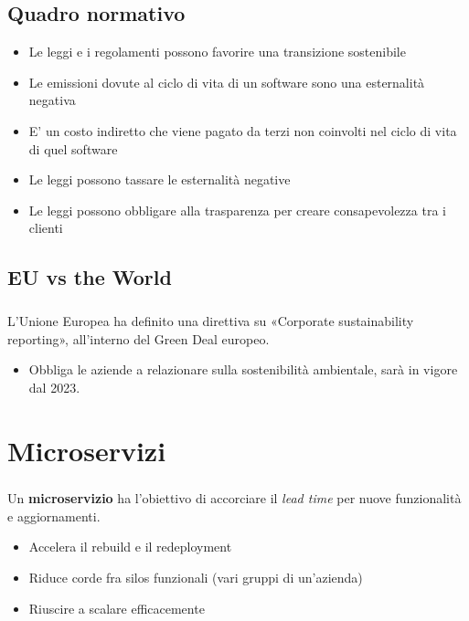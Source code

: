 \documentclass[a4paper, 12pt]{report}
\begin{document}
          \section{Quadro normativo}
          \begin{itemize}
            \item Le leggi e i regolamenti possono favorire una transizione sostenibile
            \item Le emissioni dovute al ciclo di vita di un software sono una esternalità negativa
            \item E’ un costo indiretto che viene pagato da terzi non coinvolti nel ciclo di vita di quel software
            \item Le leggi possono tassare le esternalità negative 
            \item Le leggi possono obbligare alla trasparenza per creare consapevolezza tra i clienti
          \end{itemize}
          \section{EU vs the World}
          \paragraph{}L’Unione Europea ha definito una direttiva su «Corporate sustainability reporting», all’interno del Green Deal europeo.
          \begin{itemize}
            \item Obbliga le aziende a relazionare sulla sostenibilità ambientale, sarà in vigore dal 2023.
          \end{itemize}
      \chapter{Microservizi}
          \paragraph{}Un \textbf{microservizio} ha l'obiettivo di accorciare il \textit{lead time} per nuove funzionalità e aggiornamenti. 
          \begin{itemize}
            \item Accelera il rebuild e il redeployment
            \item Riduce corde fra silos funzionali (vari gruppi di un'azienda)
            \item Riuscire a scalare efficacemente
          \end{itemize}
\end{document}
